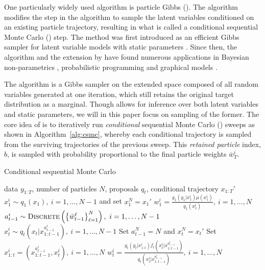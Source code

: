 One particularly widely used \pmcmc algorithm is particle Gibbs (\pg). The \pg algorithm modifies the \smc step in the \pmcmc algorithm to sample the latent variables conditioned on an existing particle trajectory, resulting in what is called a conditional sequential Monte Carlo (\csmc) step. The \pg method was first introduced as an efficient Gibbs sampler for latent variable models with static parameters \citep{andrieuDH2010}. Since then, the \pg algorithm and the extension by \citet{lindstenJS2014} have found numerous applications in \eg Bayesian non-parametrics \citep{ValeraFSPC2015,tripuraneni2015}, probabilistic programming \citep{wood2014new,vandemeent_aistats_2015} and graphical models \citep{everitt2012,naessethLS2014,naessethLS2015nested}.  

The \pg algorithm \citep{andrieuDH2010} is a Gibbs sampler on the extended space composed of all random variables generated at one iteration, which still retains the original target distribution as a marginal. Though \pg allows for inference over both latent variables and static parameters, we will in this paper focus on sampling of the former.  The core idea of \pg is to iteratively run \emph{conditional} sequential Monte Carlo (\csmc) sweeps as shown in Algorithm~\ref{alg:csmc}, whereby each conditional trajectory is sampled from the surviving trajectories of the previous sweep.  This \emph{retained particle} index, $b$, is sampled with probability proportional to the final particle weights $\bar{w}^i_T$. 

\begin{algorithm}[tb]
	\caption{Conditional sequential Monte Carlo}
	\label{alg:csmc}
	\begin{spacing}{1.2}
		\begin{algorithmic}[1]
			\renewcommand{\algorithmicrequire}{\textbf{Inputs:}}
			\renewcommand{\algorithmicensure}{\textbf{Outputs:}}				 
			\Require data $y_{1:T}$, number of particles $N$, proposals $q_t$, conditional trajectory $x_{1:T}'$
			\State $x_1^i \sim q_1(x_1), ~i=1,\ldots,N-1$ and set $x_1^N = x_1'$
			\State $w_1^i = \frac{g_1(y_1|x_1^i) \mu(x_1^i)}{q_1(x_1^i)}, ~i=1,\ldots,N$
			\State $a_{t-1}^i \sim \operatorname*{\textsc{Discrete}}\left(\left\{\bar w_{t-1}^\ell\right\}_{\ell=1}^N\right), ~i=1,\ldots,N-1$
			\State $x_t^i \sim q_t(x_t | x_{1:t-1}^{a_{t-1}^i}), ~i=1,\ldots,N-1$
			\State Set $a_{t-1}^N = N$ and $x_t^N = x_t'$
			\State Set $x_{1:t}^i = (x_{1:t-1}^{a_{t-1}^i},x_t^i), ~i=1,\ldots,N$
			\State $w_t^i = \frac{g_t(y_t|x_{1:t}^i) f_t(x_t^i | x_{1:t-1}^{a_{t-1}^i})}{q_t(x_t^i|x_{1:t-1}^{a_{t-1}^i})}, ~i=1,\ldots,N$
			\EndFor
		\end{algorithmic}
	\end{spacing}
\end{algorithm}

